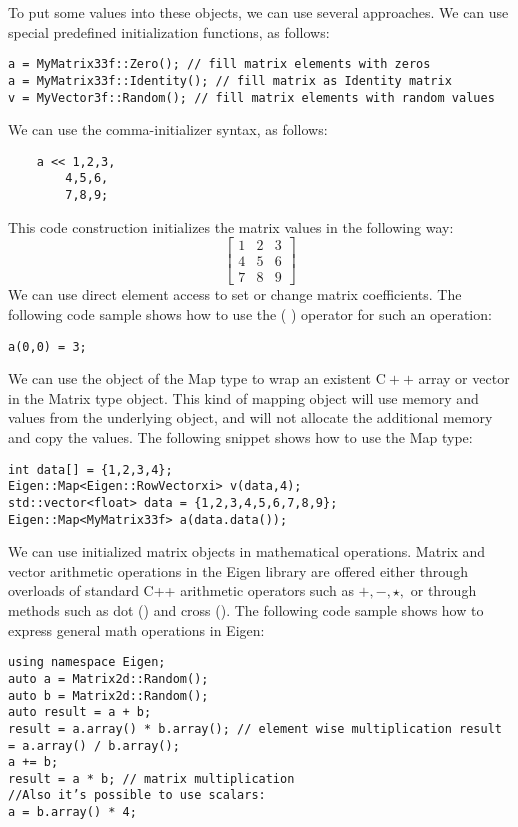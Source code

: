 \documentclass[12pt]{article}
\begin{document}
To put some values into these objects, we can use several approaches. We can use special predefined initialization functions, as follows:
\begin{verbatim}
a = MyMatrix33f::Zero(); // fill matrix elements with zeros
a = MyMatrix33f::Identity(); // fill matrix as Identity matrix
v = MyVector3f::Random(); // fill matrix elements with random values   
\end{verbatim}
We can use the comma-initializer syntax, as follows:
\begin{verbatim}
    a << 1,2,3,
        4,5,6,
        7,8,9;
\end{verbatim}
This code construction initializes the matrix values in the following way:
$$
\left[\begin{array}{lll}
1 & 2 & 3 \\
4 & 5 & 6 \\
7 & 8 & 9
\end{array}\right]
$$
We can use direct element access to set or change matrix coefficients. The following code sample shows how to use the ( ) operator for such an operation:
\begin{verbatim}
a(0,0) = 3;    
\end{verbatim}

We can use the object of the Map type to wrap an existent $\mathrm{C}++$ array or vector in the Matrix type object. This kind of mapping object will use memory and values from the underlying object, and will not allocate the additional memory and copy the values. The following snippet shows how to use the Map type:

\begin{verbatim}
int data[] = {1,2,3,4}; 
Eigen::Map<Eigen::RowVectorxi> v(data,4); 
std::vector<float> data = {1,2,3,4,5,6,7,8,9}; 
Eigen::Map<MyMatrix33f> a(data.data());    
\end{verbatim}

We can use initialized matrix objects in mathematical operations. Matrix and vector arithmetic operations in the Eigen library are offered either through overloads of standard C++ arithmetic operators such as $+,-, \star,$ or through methods such as dot () and cross (). The following code sample shows how to express general math operations in Eigen:

\begin{verbatim}
using namespace Eigen;
auto a = Matrix2d::Random();
auto b = Matrix2d::Random();
auto result = a + b;
result = a.array() * b.array(); // element wise multiplication result = a.array() / b.array();
a += b;
result = a * b; // matrix multiplication
//Also it’s possible to use scalars:
a = b.array() * 4;    
\end{verbatim}
\end{document}

